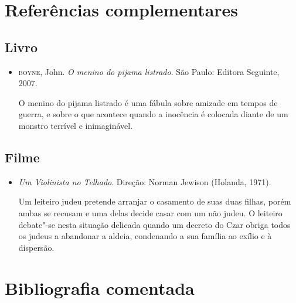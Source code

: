 \documentclass[12pt]{extarticle}
\begin{document}
\section{Referências complementares}

\subsection{Livro}

\begin{itemize}
\item\textsc{boyne}, John. \textit{O menino do pijama listrado}. São Paulo: Editora
Seguinte, 2007.

O menino do pijama listrado é uma fábula sobre amizade em tempos de
guerra, e sobre o que acontece quando a inocência é colocada diante de
um monstro terrível e inimaginável.
\end{itemize}

\subsection{Filme}

\begin{itemize}
\item\textit{Um Violinista no Telhado}. Direção: Norman Jewison (Holanda, 1971).

Um leiteiro judeu pretende arranjar o casamento de suas duas filhas,
porém ambas se recusam e uma delas decide casar com um não judeu. O
leiteiro debate"-se nesta situação delicada quando um decreto do Czar
obriga todos os judeus a abandonar a aldeia, condenando a sua família ao
exílio e à dispersão.
\end{itemize}

\section{Bibliografia comentada}
\end{document}

